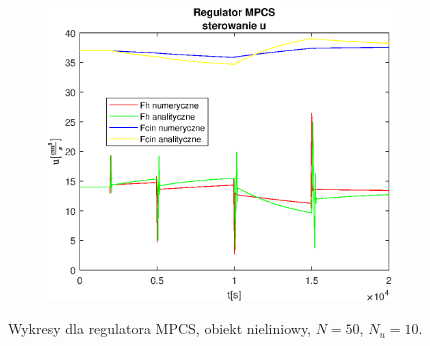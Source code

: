 \begin{figure}[h!]
   \begin{subfigure}[b]{0.4\textwidth}
      \includegraphics[width=1\linewidth]{img/MPCSnumRK/MPCSRKControlN50Nu10l20.eps}
      \caption{}
      \label{fig:fig:MPCSRKN50Nu10l203}
   \end{subfigure}
       
   \caption{Wykresy dla regulatora MPCS, obiekt nieliniowy, $N = 50$, $N_u = 10$.}
   \label{fig:MPCSRKN50Nu10l20}
\end{figure}
           
